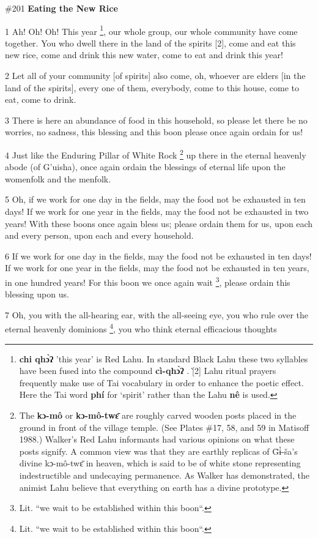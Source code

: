 
\#201 \textbf{Eating the New Rice}

1 Ah! Oh! Oh! This year \footnote{\textbf{chi qhɔ̀ʔ} 'this year' is Red Lahu. In standard Black Lahu these two syllables have been fused into the compound \textbf{ cì-qhɔ̀ʔ} .  [̀2] Lahu ritual prayers frequently make use of Tai vocabulary in order to enhance the poetic effect. Here the Tai word \textbf{phí }for `spirit' rather than the Lahu\textbf{ nê} is used.}, our whole group, our whole community have come together.
You who dwell there in the land of the spirits [2], come and eat this new rice,
come and drink this new water, come to eat and drink this year!

2 Let all of your community [of spirits] also come, oh, whoever are elders [in
the land of the spirits], every one of them, everybody, come to this house, come
to eat, come to drink.

3 There is here an abundance of food in this household, so please let there be
no worries, no sadness, this blessing and this boon please once again ordain for
us!

4 Just like the Enduring Pillar of White Rock \footnote{The \textbf{kɔ-mô} or \textbf{kɔ-mô-twɛ̄} are roughly carved wooden posts placed in the ground in front of the village temple. (See Plates \#17, 58, and 59 in Matisoff 1988.) Walker's Red Lahu  informants had various opinions on what these posts signify. A common view was that they are earthly replicas of G̈ɨ̀-ša's divine kɔ-mô-twɛ̄ in heaven, which is said to be of white stone representing indestructible and undecaying permanence. As Walker has demonstrated, the animist Lahu believe that everything on earth has a divine prototype.} up there in the eternal heavenly
abode (of G'uisha), once again ordain the blessings of eternal life upon the womenfolk
and the menfolk.

5 Oh, if we work for one day in the fields, may the food not be exhausted in ten
days!  If we work for one year in the fields, may the food not be exhausted in
two years!  With these boons once again bless us; please ordain them for us, upon
each and every person, upon each and every household.

6 If we work for one day in the fields, may the food not be exhausted in ten days!
If we work for one year in the fields, may the food not be exhausted in ten years,
in one hundred years! For this boon we once again wait \footnote{Lit. ``we wait to be established within this boon``.}, please ordain this
blessing upon us.

7 Oh, you with the all-hearing ear, with the all-seeing eye, you who rule over
the eternal heavenly dominions \footnote{Lit. ``we wait to be established within this boon``.}, you who think eternal efficacious thoughts
